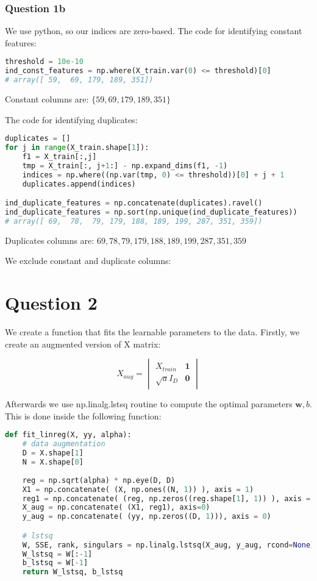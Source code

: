 \documentclass{article}
\begin{document}
\subsubsection*{Question 1b}

We use python, so our indices are zero-based. 
The code for identifying constant features:
\begin{lstlisting}[language = Python]
threshold = 10e-10
ind_const_features = np.where(X_train.var(0) <= threshold)[0]
# array([ 59,  69, 179, 189, 351])
\end{lstlisting}
Constant columns are: $\{59,  69, 179, 189, 351\}$


The code for identifying duplicates:
\begin{lstlisting}[language = Python]
duplicates = []
for j in range(X_train.shape[1]):
    f1 = X_train[:,j]
    tmp = X_train[:, j+1:] - np.expand_dims(f1, -1)
    indices = np.where((np.var(tmp, 0) <= threshold))[0] + j + 1
    duplicates.append(indices)

ind_duplicate_features = np.concatenate(duplicates).ravel()
ind_duplicate_features = np.sort(np.unique(ind_duplicate_features))
# array([ 69,  78,  79, 179, 188, 189, 199, 287, 351, 359])
\end{lstlisting}

Duplicates columns are: $ 69,  78,  79, 179, 188, 189, 199, 287, 351, 359 $

We exclude constant and duplicate columns:


\section*{Question 2}

We create a function that fits the learnable parameters to the data. Firstly, we create an augmented version of X matrix:

$$ \displaystyle
X_{aug} = \begin{vmatrix}
    X_{train} & \textbf{1} \\
    \sqrt{a}I_D & \textbf{0} 
\end{vmatrix}
$$

Afterwards we use np.linalg.lstsq routine to compute the optimal parameters $\textbf{w}, b$. This is done inside the following function:

\begin{lstlisting}[language= Python]
def fit_linreg(X, yy, alpha):
    # data augmentation
    D = X.shape[1]
    N = X.shape[0]
    
    reg = np.sqrt(alpha) * np.eye(D, D)
    X1 = np.concatenate( (X, np.ones((N, 1)) ), axis = 1)
    reg1 = np.concatenate( (reg, np.zeros((reg.shape[1], 1)) ), axis = 1)
    X_aug = np.concatenate( (X1, reg1), axis=0)
    y_aug = np.concatenate( (yy, np.zeros((D, 1))), axis = 0)

    # lstsq
    W, SSE, rank, singulars = np.linalg.lstsq(X_aug, y_aug, rcond=None)
    W_lstsq = W[:-1]
    b_lstsq = W[-1]
    return W_lstsq, b_lstsq
\end{lstlisting}
\end{document}
